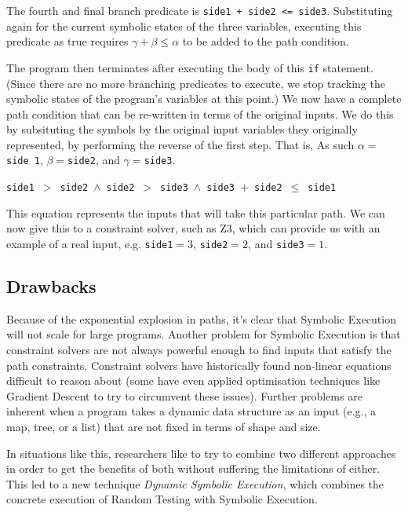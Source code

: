 The fourth and final branch predicate is {\tt side1 + side2 <= side3}.
Substituting again for the current symbolic states of the three variables, 
executing this predicate as true requires $\gamma + \beta \leq \alpha$ to be
added to the path condition. 

The program then terminates after executing the body of this {\tt if} statement.
(Since there are no more branching predicates to execute, we stop tracking the
symbolic states of the program's variables at this point.) We now have a
complete path condition that can be re-written in terms of the original inputs.
We do this by subsituting the symbols by the original input variables they
originally represented, by performing the reverse of the first step. That is, As
such $\alpha = ${\tt side 1}, $\beta = ${\tt side2}, and $\gamma = ${\tt side3}.

\begin{center}
{\tt side1}~$ > $~{\tt side2}~$ \wedge $~{\tt side2}~$ > $~{\tt side3}~$ \wedge
$~{\tt side3}~$ + $~{\tt side2}~$ \leq $~{\tt side1}
\end{center}

This equation represents the inputs that will take this particular path. We can
now give this to a constraint solver, such as Z3, which can provide us with an
example of a real input, e.g. {\tt side1}$ =
3$, {\tt side2}$ = 2$, and {\tt side3}$ = 1$.

\subsection{Drawbacks}

Because of the exponential explosion in paths, it's clear that Symbolic
Execution will not scale for large programs. Another problem for Symbolic
Execution is that constraint solvers are not always powerful enough to find
inputs that satisfy the path constraints. Constraint solvers have historically
found non-linear equations difficult to reason about (some have even applied
optimisation techniques like Gradient Descent to try to circumvent these
issues). Further problems are inherent when a program takes a dynamic data
structure as an input (e.g., a map, tree, or a list) that are not fixed in terms
of shape and size. 

In situations like this, researchers like to try to combine two different
approaches in order to get the benefits of both without suffering the
limitations of either. This led to a new technique {\it Dynamic Symbolic
Execution}, which combines the concrete execution of Random Testing with
Symbolic Execution.

